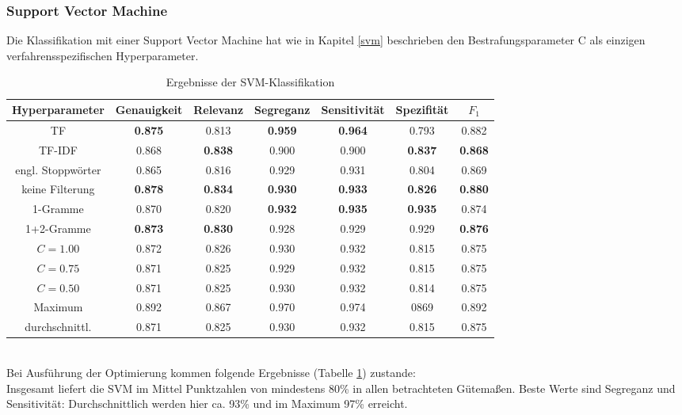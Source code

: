 \subsubsection{Support Vector Machine}
Die Klassifikation mit einer Support Vector Machine hat wie in Kapitel \ref{svm} beschrieben den Bestrafungsparameter C als einzigen verfahrensspezifischen Hyperparameter.
\begin{table}[htb]
	\begin{center}
		\begin{tabular}{|c|c|c|c|c|c|c|}
			\hline 
			Hyperparameter & Genauigkeit & Relevanz & Segreganz & Sensitivität & Spezifität & $F_1$ \\ \hline \hline
			TF         & \textbf{0.875} & 0.813 & \textbf{0.959} & \textbf{0.964} & 0.793 & 0.882 \\ \hline
			TF-IDF     & 0.868 & \textbf{0.838} & 0.900 & 0.900 & \textbf{0.837} & \textbf{0.868} \\ \hline \hline
			engl. Stoppwörter  & 0.865 & 0.816 & 0.929 & 0.931 & 0.804 & 0.869 \\ \hline
			keine Filterung    & \textbf{0.878} & \textbf{0.834} & \textbf{0.930} & \textbf{0.933} & \textbf{0.826} & \textbf{0.880} \\ \hline \hline
			1-Gramme   & 0.870 & 0.820 & \textbf{0.932} & \textbf{0.935} & \textbf{0.935} & 0.874 \\ \hline
			1+2-Gramme  & \textbf{0.873} & \textbf{0.830} & 0.928 & 0.929 & 0.929 & \textbf{0.876} \\ \hline \hline
			$C=1.00$ & 0.872 & 0.826 & 0.930 & 0.932 & 0.815 & 0.875 \\ \hline 
			$C=0.75$ & 0.871 & 0.825 & 0.929 & 0.932 & 0.815 & 0.875 \\ \hline 
			$C=0.50$ & 0.871 & 0.825 & 0.930 & 0.932 & 0.814 & 0.875 \\ \hline
			\hline
			Maximum        & 0.892 & 0.867 & 0.970 & 0.974 & 0869 & 0.892 \\ \hline
			durchschnittl. & 0.871 & 0.825 & 0.930 & 0.932 & 0.815 & 0.875 \\ \hline
		\end{tabular}
		\caption{Ergebnisse der SVM-Klassifikation}\label{results-svm}
	\end{center}
\end{table}\\
Bei Ausführung der Optimierung kommen folgende Ergebnisse (Tabelle \ref{results-svm}) zustande:\\
Insgesamt liefert die SVM im Mittel Punktzahlen von mindestens 80\% in allen betrachteten Gütemaßen. Beste Werte sind Segreganz und Sensitivität: Durchschnittlich werden hier ca. 93\% und im Maximum 97\% erreicht.\\
